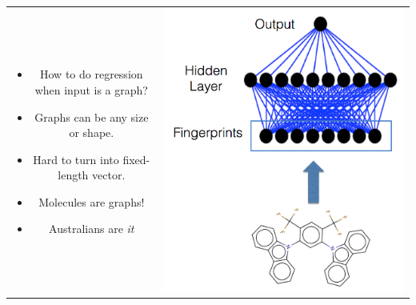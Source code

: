 \documentclass[landscape,a0b,final,a4resizeable]{include/a0poster}
\begin{document}
\begin{poster}
\begin{multicols}{3}
\begin{tabular}{cc}
\begin{minipage}[c]{0.5\columnwidth}
\begin{itemize}
  \item How to do regression when input is a graph?
  \item Graphs can be any size or shape.
  \item Hard to turn into fixed-length vector.
  \item Molecules are graphs!
  \item Australians are \emph{it}
\end{itemize}
\end{minipage} & 
\begin{minipage}[c]{0.5\columnwidth}
\centerline{\includegraphics[width=1.0\columnwidth, clip, trim=4mm 10mm 4mm 4mm]{figures/how-fingerprints.png}}
\end{minipage}
\end{tabular}

\vspace{-0.5in}


\end{multicols}
\end{poster}
\end{document}
